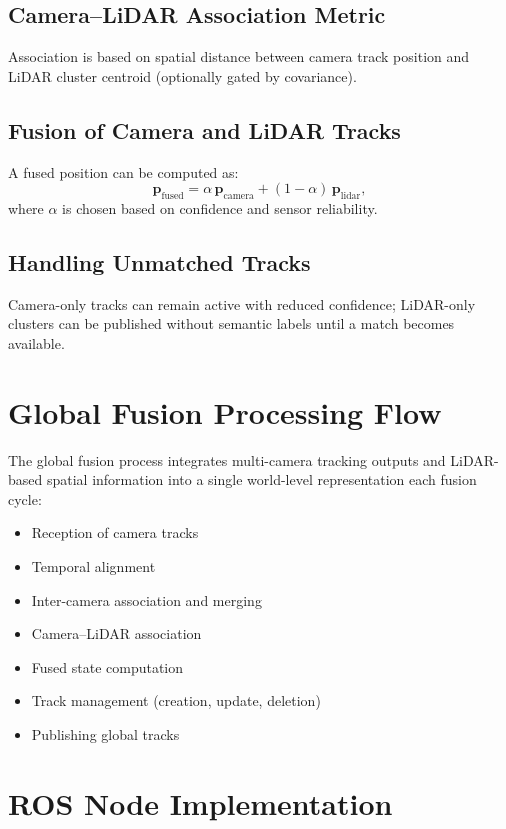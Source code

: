 \documentclass[12pt,a4paper]{report}
\begin{document}
\subsection{Camera--LiDAR Association Metric}
Association is based on spatial distance between camera track position and LiDAR cluster centroid (optionally gated by covariance).

\subsection{Fusion of Camera and LiDAR Tracks}
A fused position can be computed as:
\begin{equation}
\mathbf{p}_{\mathrm{fused}} = \alpha\,\mathbf{p}_{\mathrm{camera}} + (1-\alpha)\,\mathbf{p}_{\mathrm{lidar}},
\end{equation}
where $\alpha$ is chosen based on confidence and sensor reliability.

\subsection{Handling Unmatched Tracks}
Camera-only tracks can remain active with reduced confidence; LiDAR-only clusters can be published without semantic labels until a match becomes available.

\section{Global Fusion Processing Flow}
The global fusion process integrates multi-camera tracking outputs and LiDAR-based spatial information into a single world-level representation each fusion cycle:
\begin{itemize}
    \item Reception of camera tracks
    \item Temporal alignment
    \item Inter-camera association and merging
    \item Camera--LiDAR association
    \item Fused state computation
    \item Track management (creation, update, deletion)
    \item Publishing global tracks
\end{itemize}

\section{ROS Node Implementation}
\end{document}
